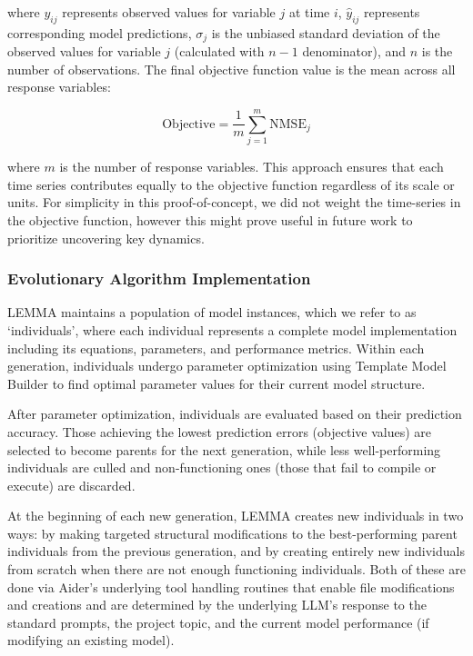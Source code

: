 where $y_{ij}$ represents observed values for variable $j$ at time $i$, $\hat{y}_{ij}$ represents corresponding model predictions, $\sigma_j$ is the unbiased standard deviation of the observed values for variable $j$ (calculated with $n-1$ denominator), and $n$ is the number of observations. The final objective function value is the mean across all response variables:

\begin{equation}
    \text{Objective} = \frac{1}{m} \sum_{j=1}^{m} \text{NMSE}_j
\end{equation}

where $m$ is the number of response variables. This approach ensures that each time series contributes equally to the objective function regardless of its scale or units. For simplicity in this proof-of-concept, we did not weight the time-series in the objective function, however this might prove useful in future work to prioritize uncovering key dynamics.

\subsubsection{Evolutionary Algorithm Implementation}

LEMMA maintains a population of model instances, which we refer to as `individuals', where each individual represents a complete model implementation including its equations, parameters, and performance metrics. Within each generation, individuals undergo parameter optimization using Template Model Builder to find optimal parameter values for their current model structure. 

After parameter optimization, individuals are evaluated based on their prediction accuracy. Those achieving the lowest prediction errors (objective values) are selected to become parents for the next generation, while less well-performing individuals are culled and non-functioning ones (those that fail to compile or execute) are discarded. 

At the beginning of each new generation, LEMMA creates new individuals in two ways: by making targeted structural modifications to the best-performing parent individuals from the previous generation, and by creating entirely new individuals from scratch when there are not enough functioning individuals. Both of these are done via Aider's underlying tool handling routines that enable file modifications and creations and are determined by the underlying LLM's response to the standard prompts, the project topic, and the current model performance (if modifying an existing model).

